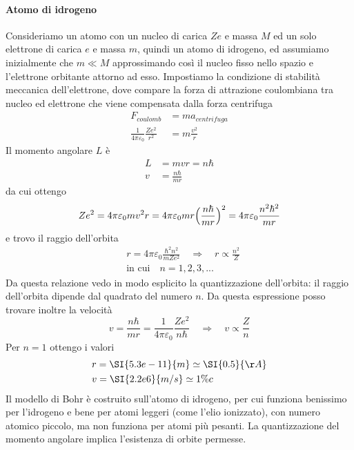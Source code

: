 \paragraph{Atomo di idrogeno} Consideriamo un atomo con un nucleo di carica $Ze$ e massa $M$ ed un solo elettrone di carica $e$ e massa $m$, quindi un atomo di idrogeno, ed assumiamo inizialmente che $m \ll M$ approssimando così il nucleo fisso nello spazio e l'elettrone orbitante attorno ad esso.
Impostiamo la condizione di stabilità meccanica dell'elettrone, dove compare la forza di attrazione coulombiana tra nucleo ed elettrone che viene compensata dalla forza centrifuga
\begin{equation}
\begin{split}
F_{coulomb} & = ma_{centrifuga} \\ 
\frac{1}{4\pi \varepsilon_0} \frac{Z e^2}{r^2} & = m \frac{v^2}{r}
\end{split}
\end{equation}
Il momento angolare $L$ è 
\begin{equation}
\begin{split}
L & = m v r = n \hbar \\
v & = \frac{ n\hbar}{m r }
\end{split}
\end{equation}
da cui ottengo 
\begin{equation}
Ze^2 = 4 \pi \varepsilon_0 m v^2 r = 4\pi \varepsilon_0 m r \Bigl(  \frac{ n\hbar}{mr }  \Bigr)^2 = 4\pi \varepsilon_0 \frac{ n^2 \hbar^2}{m r }
\end{equation}
e trovo il raggio dell'orbita
\begin{equation}
\begin{split}
& r = 4\pi \varepsilon_0 \frac{ \hbar^2 n^2}{m Z e^2 } \quad\Rightarrow\quad r \propto \frac{ n^2}{Z }\\
& \mbox{in cui} \quad n = 1,2,3,...
\label{raggio_bohr}
\end{split}
\end{equation}
Da questa relazione vedo in modo esplicito la quantizzazione dell'orbita: il raggio dell'orbita dipende dal quadrato del numero $n$.
Da questa espressione posso trovare inoltre la velocità
\begin{equation}
v = \frac{ n\hbar}{m r } = \frac{ 1}{4\pi \varepsilon_0 } \frac{ Z e^2}{n\hbar } \quad\Rightarrow\quad v \propto \frac{ Z}{n }
\label{velocita_bohr}
\end{equation}
Per $n=1$ ottengo i valori
\begin{equation}
\begin{split}
& r = \SI{5.3e-11}{m} \simeq \SI{0.5}{\AA} \\
& v = \SI{2.2e6}{m/s} \simeq 1\% c
\end{split}
\end{equation}
Il modello di Bohr è costruito sull'atomo di idrogeno, per cui funziona benissimo per l'idrogeno e bene per atomi leggeri (come l'elio ionizzato), con numero atomico piccolo, ma non funziona per atomi più pesanti.
La quantizzazione del momento angolare implica l'esistenza di orbite permesse.
